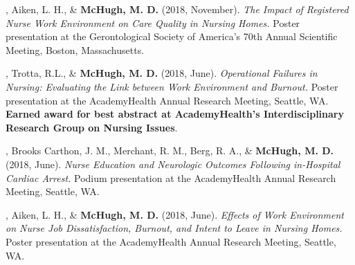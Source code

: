\documentclass[10pt,]{article}
\begin{document}
{{{{{{{{{{{{{{\begin{hangparas}{.25in}{1}
\end{hangparas}

\vspace{4mm}


\begin{hangparas}{.25in}{1}

, Aiken, L. H., \& {\textbf {McHugh, M. D.}} (2018, November). {\textit {The Impact of Registered Nurse Work Environment on Care Quality in Nursing Homes.}} Poster presentation at the Gerontological Society of America's 70th Annual Scientific Meeting, Boston, Massachusetts.

\end{hangparas}

\vspace{4mm}

\begin{hangparas}{.25in}{1}

, Trotta, R.L., \& {\textbf {McHugh, M. D.}} (2018, June). {\textit {Operational Failures in Nursing: Evaluating the Link between Work Environment and Burnout.}} Poster presentation at the AcademyHealth Annual Research Meeting, Seattle, WA. {\textbf {Earned award for best abstract at AcademyHealth's Interdisciplinary Research Group on Nursing Issues}}.

\end{hangparas}

\vspace{4mm}

\begin{hangparas}{.25in}{1}

, Brooks Carthon, J. M., Merchant, R. M., Berg, R. A., \& {\textbf {McHugh, M. D.}} (2018, June). {\textit {Nurse Education and Neurologic Outcomes Following in-Hospital Cardiac Arrest.}} Podium presentation at the AcademyHealth Annual Research Meeting, Seattle, WA.

\end{hangparas}

\vspace{4mm}

\begin{hangparas}{.25in}{1}

, Aiken, L. H., \& {\textbf {McHugh, M. D.}} (2018, June). {\textit {Effects of Work Environment on Nurse Job Dissatisfaction, Burnout, and Intent to Leave in Nursing Homes.}} Poster presentation at the AcademyHealth Annual Research Meeting, Seattle, WA.


\end{hangparas}}}}}}}}}}}}}}}
\end{document}
